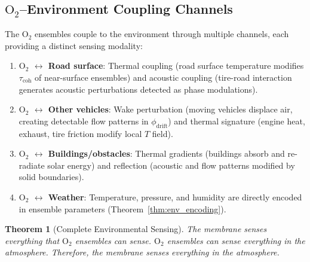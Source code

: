 \documentclass[12pt]{article}
\newtheorem{theorem}{Theorem}[section]
\theoremstyle{definition}
\theoremstyle{remark}
\begin{document}
\subsection{$\mathrm{O}_2$--Environment Coupling Channels}

The $\mathrm{O}_2$ ensembles couple to the environment through multiple channels, each providing a distinct sensing modality:

\begin{enumerate}[label=(\roman*)]
  \item \textbf{$\mathrm{O}_2$ $\leftrightarrow$ Road surface}: Thermal coupling (road surface temperature modifies $\tau_{\mathrm{coh}}$ of near-surface ensembles) and acoustic coupling (tire-road interaction generates acoustic perturbations detected as phase modulations).

  \item \textbf{$\mathrm{O}_2$ $\leftrightarrow$ Other vehicles}: Wake perturbation (moving vehicles displace air, creating detectable flow patterns in $\phi_{\mathrm{drift}}$) and thermal signature (engine heat, exhaust, tire friction modify local $T$ field).

  \item \textbf{$\mathrm{O}_2$ $\leftrightarrow$ Buildings/obstacles}: Thermal gradients (buildings absorb and re-radiate solar energy) and reflection (acoustic and flow patterns modified by solid boundaries).

  \item \textbf{$\mathrm{O}_2$ $\leftrightarrow$ Weather}: Temperature, pressure, and humidity are directly encoded in ensemble parameters (Theorem~\ref{thm:env_encoding}).
\end{enumerate}

\begin{theorem}[Complete Environmental Sensing]
\label{thm:complete_sensing}
The membrane senses everything that $\mathrm{O}_2$ ensembles can sense. $\mathrm{O}_2$ ensembles can sense everything in the atmosphere. Therefore, the membrane senses everything in the atmosphere.
\end{theorem}
\end{document}
